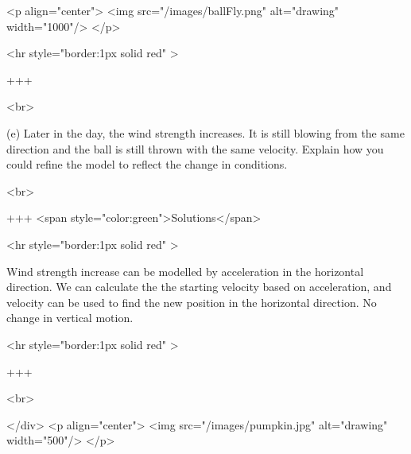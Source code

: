 <p align="center">
<img src="/images/ballFly.png" alt="drawing" width="1000"/>
</p>

<hr style="border:1px solid red" >

+++

<br>

(e) Later in the day, the wind strength increases. It is still blowing from the same direction and the ball is still thrown with the same velocity. Explain how you could refine the model to reflect the change in conditions.

<br>

+++ <span style="color:green">Solutions</span>

<hr style="border:1px solid red" >

Wind strength increase can be modelled by acceleration in the horizontal direction. We can calculate the the starting velocity based on acceleration, and velocity can be used to find the new position in the horizontal direction. 
No change in vertical motion.

<hr style="border:1px solid red" >

+++

<br>

</div>
<p align="center">
<img src="/images/pumpkin.jpg" alt="drawing" width="500"/>
</p>

